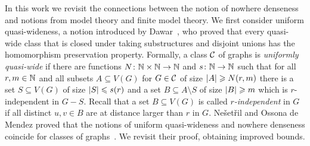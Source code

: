 \begin{comment}
These alternative characterizations have been very useful in 
the design of efficient algorithms. For instance, 
the {\sc{Subgraph Isomorphism}} and {\sc{Homomorphism}} problems 
are fixed-parameter tractable on any nowhere dense
class, parameterized by the size of the pattern graph~\cite{nevsetvril2010first}
and so is the {\sc Distance-$r$ Dominating Set} problem, parameterized
by the size of the solution~\cite{DawarK09}. In fact, 
the {\sc Distance-$r$ Dominating Set} problem admits
polynomial kernels~\cite{siebertz2016polynomial} and even 
almost linear kernels on nowhere dense classes of 
graphs~\cite{eickmeyer2016neighborhood}
(see also~\cite{drange2016kernelization} for the case $r=1$). 
It was shown in~\cite{grohe2014deciding}
that every first-order definable problem can be decided in
almost linear time on any nowhere dense graph class.

It is a natural question to ask for the most general classes of graphs
which admit efficient solutions for certain problems, or to 
classify them into tractable and intractable classes. It was shown 
that for the first-order model-checking problem~\cite{dvovrak2013testing} and for
the {\sc Distance-$r$ Dominating Set} problem~\cite{drange2016kernelization} 
the dividing line for algorithmic tractability 
on subgraph closed classes of graphs is exactly between the
nowhere dense and somewhere dense graph classes. 
\end{comment}


In this work we revisit the connections between the notion of nowhere 
denseness and notions from  model theory and finite model theory.
We first consider uniform quasi-wideness, a
notion  introduced by Dawar~\cite{dawar2010homomorphism}, who 
proved that every quasi-wide class that is closed under taking substructures
and disjoint unions has the homomorphism preservation property. 
Formally, a class $\mathcal{C}$ of graphs is \emph{uniformly quasi-wide} if there are
functions $N\colon \mathbb{N}\times\mathbb{N}\rightarrow \mathbb{N}$ and $s\colon \mathbb{N}\rightarrow \mathbb{N}$ such
that for all $r,m\in \mathbb{N}$ and all subsets $A\subseteq V(G)$ for
$G\in \mathcal{C}$ of size $\left\lvert A\right\rvert\geqslant N(r,m)$ there is a set
$S\subseteq V(G)$ of size $\left\lvert S\right\rvert\leqslant s(r)$ and a set
$B\subseteq A\setminus S$ of size $\left\lvert B\right\rvert\geqslant m$ which is $r$-independent in
$G-S$. Recall that a set $B\subseteq V(G)$ is called {\em{$r$-independent}} in $G$ if all
distinct $u,v\in B$ are at distance 
larger than $r$ in $G$.
 Ne\v{s}et\v{r}il and Ossona de Mendez proved that
the notions of uniform quasi-wideness and nowhere denseness coincide for 
classes of graphs~\cite{nevsetvril2011nowhere}. 
We revisit their proof, obtaining improved bounds.


